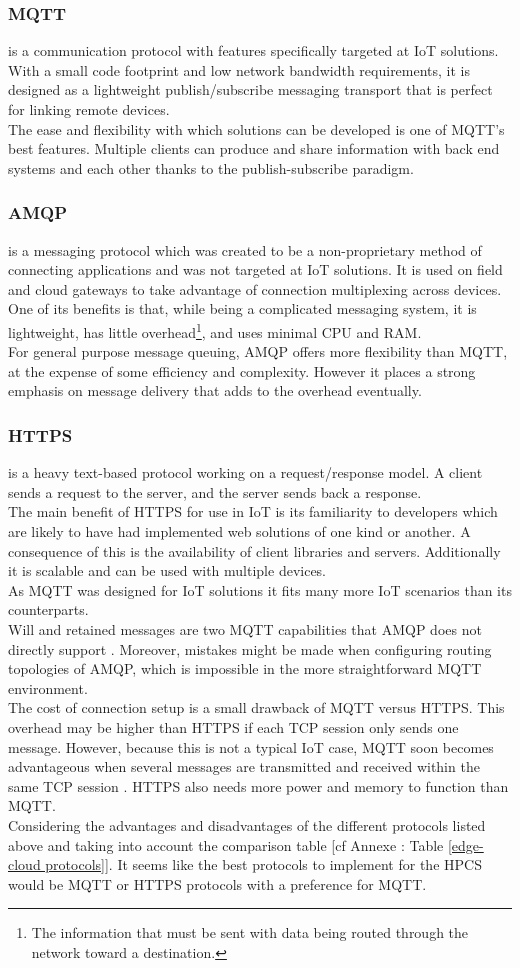 \subsubsection{MQTT} is a communication protocol with features specifically targeted at IoT solutions. With a small code footprint and low network bandwidth requirements, it is designed as a lightweight publish/subscribe messaging transport that is perfect for linking remote devices.\\
The ease and flexibility with which solutions can be developed is one of MQTT's best features. Multiple clients can produce and share information with back end systems and each other thanks to the publish-subscribe paradigm.

\subsubsection{AMQP} is a messaging protocol which was created to be a non-proprietary method of connecting applications and was not targeted at IoT solutions. It is used on field and cloud gateways to take advantage of connection multiplexing across devices. One of its benefits is that, while being a complicated messaging system, it is lightweight, has little overhead\footnote{The information that must be sent with data being routed through the network toward a destination.}, and uses minimal CPU and RAM. \\
For general purpose message queuing, AMQP offers more flexibility than MQTT, at the expense of some efficiency and complexity. However it places a strong emphasis on message delivery that adds to the overhead eventually.

\subsubsection{HTTPS} is a heavy text-based protocol working on a request/response model. A client sends a request to the server, and the server sends back a response.\\
The main benefit of HTTPS for use in IoT is its familiarity to developers which are likely to have had implemented web solutions of one kind or another. A consequence of this is the availability of client libraries and servers. Additionally it is scalable and can be used with multiple devices.\\


As MQTT was designed for IoT solutions it fits many more IoT scenarios than its counterparts. \\
Will and retained messages are two MQTT capabilities that AMQP does not directly support \cite{b2}. Moreover, mistakes might be made when configuring routing topologies of AMQP, which is impossible in the more straightforward MQTT environment.\\
The cost of connection setup is a small drawback of MQTT versus HTTPS. This overhead may be higher than HTTPS if each TCP session only sends one message. However, because this is not a typical IoT case, MQTT soon becomes advantageous when several messages are transmitted and received within the same TCP session \cite{b3}. HTTPS also needs more power and memory to function than MQTT.\\

Considering the advantages and disadvantages of the different protocols listed above and taking into account the comparison table [cf Annexe : Table \ref{edge-cloud protocols}].
It seems like the best protocols to implement for the HPCS would be MQTT or HTTPS protocols with a preference for MQTT.